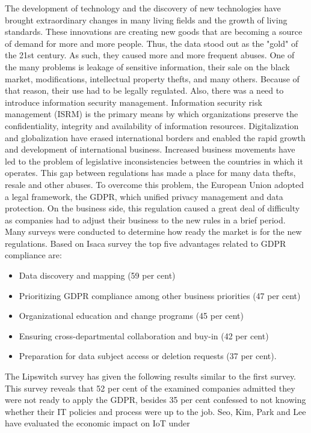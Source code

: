 \documentclass[11pt,english]{article}
\begin{document}
\quad The development of technology and the discovery of new technologies have brought extraordinary changes in many living fields and the growth of living standards. These innovations are creating new goods that are becoming a source of demand for more and more people. Thus, the data stood out as the "gold" of the 21st century. As such, they caused more and more frequent abuses. One of the many problems is leakage of sensitive information, their sale on the black market, modifications, intellectual property thefts, and many others. Because of that reason, their use had to be legally regulated. Also, there was a need to introduce information security management. Information security risk management (ISRM) is the primary means by which organizations preserve the confidentiality, integrity and availability of information resources. \cite{WEBB20141} Digitalization and globalization have erased international borders and enabled the rapid growth and development of international business. Increased business movements have led to the problem of legislative inconsistencies between the countries in which it operates. This gap between regulations has made a place for many data thefts, resale and other abuses. To overcome this problem, the European Union adopted a legal framework, the GDPR, which unified privacy management and data protection. On the business side, this regulation caused a great deal of difficulty as companies had to adjust their business to the new rules in a brief period.
\newline \quad Many surveys were conducted to determine how ready the market is for the new regulations. Based on Isaca survey \cite{isaca} the top five advantages related to GDPR compliance are:
\begin{itemize}
  \item Data discovery and mapping (59 per cent)
  \item Prioritizing GDPR compliance among other business priorities (47 per cent)
  \item Organizational education and change programs (45 per cent)
  \item Ensuring cross-departmental collaboration and buy-in (42 per cent)
  \item Preparation for data subject access or deletion requests (37 per cent).
\end{itemize}
\quad The Lipswitch survey \cite{lipswitch} has given the following results similar to the first survey. This survey reveals that 52 per cent of the examined companies admitted they were not ready to apply the GDPR, besides 35 per cent confessed to not knowing whether their IT policies and process were up to the job. Seo, Kim, Park and Lee \cite{8190804} have evaluated the economic impact on IoT under
\end{document}

